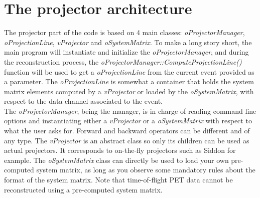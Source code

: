 \documentclass[a4paper, 11pt]{article}
\begin{document}
\section{The projector architecture}

The projector part of the code is based on 4 main classes: \textit{oProjectorManager}, \textit{oProjectionLine}, \textit{vProjector} and \textit{oSystemMatrix}.
To make a long story short, the main program will instantiate and initialize the \textit{oProjectorManager}, and during the reconstruction process, the
\textit{oProjectorManager::ComputeProjectionLine()} function will be used to get a \textit{oProjectionLine} from the current event provided as a parameter.
The \textit{oProjectionLine} is somewhat a container that holds the system matrix elements computed by a \textit{vProjector} or loaded by the \textit{oSystemMatrix},
with respect to the data channel associated to the event.\\

The \textit{oProjectorManager}, being the manager, is in charge of reading command line options and instantiating either a \textit{vProjector} or a
\textit{oSystemMatrix} with respect to what the user asks for. Forward and backward operators can be different and of any type. The \textit{vProjector} is an
abstract class so only its children can be used as actual projectors. It corresponds to on-the-fly projectors such as Siddon for example. The \textit{oSystemMatrix}
class can directly be used to load your own pre-computed system matrix, as long as you observe some mandatory rules about the format of the system matrix. Note
that time-of-flight PET data cannot be reconstructed using a pre-computed system matrix.\\
\end{document}
